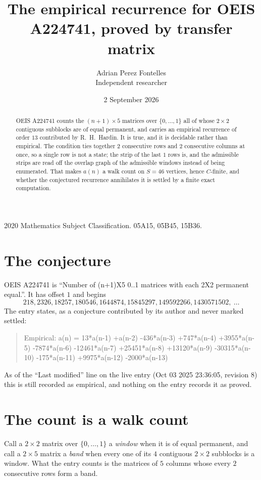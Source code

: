 \documentclass[11pt,a4paper]{article}
\title{The empirical recurrence for OEIS A224741, proved by transfer matrix}
\author{Adrian Perez Fontelles\\ \small Independent researcher}
\date{2 September 2026}
\theoremstyle{plain}
\theoremstyle{definition}
\begin{document}
\maketitle

\begin{abstract}
OEIS A224741 counts the $(n+1)\times5$ matrices over $\{0,\dots,1\}$ all of whose
$2\times2$ contiguous subblocks are of equal permanent, and carries an empirical recurrence of order
$13$ contributed by R.~H.~Hardin. It is true, and it is decidable rather than empirical.
The condition ties together $2$ consecutive rows and $2$ consecutive columns at once, so a
single row is not a state; the strip of the last $1$ rows is, and the admissible strips
are read off the overlap graph of the admissible windows instead of being enumerated. That
makes $a(n)$ a walk count on $S=46$ vertices, hence $C$-finite, and whether the conjectured
recurrence annihilates it is settled by a finite exact computation.
\end{abstract}

\noindent\small 2020 Mathematics Subject Classification. 05A15, 05B45, 15B36.\normalsize

\section{The conjecture}

OEIS A224741 is ``Number of (n+1)X5 0..1 matrices with each 2X2 permanent equal.''. It has offset $1$ and begins
\[
218, 2326, 18257, 180546, 1644874, 15845297, 149592266, 1430571502,\ \dots
\]
The entry states, as a conjecture contributed by its author and never marked settled:
\begin{quote}
Empirical: a(n) = 13*a(n-1) +a(n-2) -436*a(n-3) +747*a(n-4) +3955*a(n-5) -7874*a(n-6) -12461*a(n-7) +25451*a(n-8) +13120*a(n-9) -30315*a(n-10) -175*a(n-11) +9975*a(n-12) -2000*a(n-13)
\end{quote}
As of the ``Last modified'' line on the live entry (Oct 03 2025 23:36:05, revision 8) this is still
recorded as empirical, and nothing on the entry records it as proved.

\section{The count is a walk count}

Call a $2\times2$ matrix over $\{0,\dots,1\}$ a \emph{window} when it is of equal permanent, and
call a $2\times5$ matrix a \emph{band} when every one of its $4$ contiguous
$2\times2$ subblocks is a window. What the entry counts is the matrices of $5$ columns
whose every $2$ consecutive rows form a band.
\end{document}
